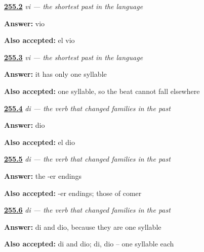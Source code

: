 \noindent\begin{minipage}[t]{\linewidth}
\raggedright
\hyperlink{review-ES-C65-vi-di-third}{\textbf{255.2}} \emph{vi — the shortest past in the language}\par
\small \textbf{Answer:} vio\par
\footnotesize \textbf{Also accepted:} el vio
\end{minipage}\par\medskip

\noindent\begin{minipage}[t]{\linewidth}
\raggedright
\hyperlink{review-ES-C65-vi-di-accent}{\textbf{255.3}} \emph{vi — the shortest past in the language}\par
\small \textbf{Answer:} it has only one syllable\par
\footnotesize \textbf{Also accepted:} one syllable, so the beat cannot fall elsewhere
\end{minipage}\par\medskip

\noindent\begin{minipage}[t]{\linewidth}
\raggedright
\hyperlink{review-ES-C65-di-gave}{\textbf{255.4}} \emph{di — the verb that changed families in the past}\par
\small \textbf{Answer:} dio\par
\footnotesize \textbf{Also accepted:} el dio
\end{minipage}\par\medskip

\noindent\begin{minipage}[t]{\linewidth}
\raggedright
\hyperlink{review-ES-C65-di-family}{\textbf{255.5}} \emph{di — the verb that changed families in the past}\par
\small \textbf{Answer:} the -er endings\par
\footnotesize \textbf{Also accepted:} -er endings; those of comer
\end{minipage}\par\medskip

\noindent\begin{minipage}[t]{\linewidth}
\raggedright
\hyperlink{review-ES-C65-di-bare}{\textbf{255.6}} \emph{di — the verb that changed families in the past}\par
\small \textbf{Answer:} di and dio, because they are one syllable\par
\footnotesize \textbf{Also accepted:} di and dio; di, dio -- one syllable each
\end{minipage}\par\medskip


